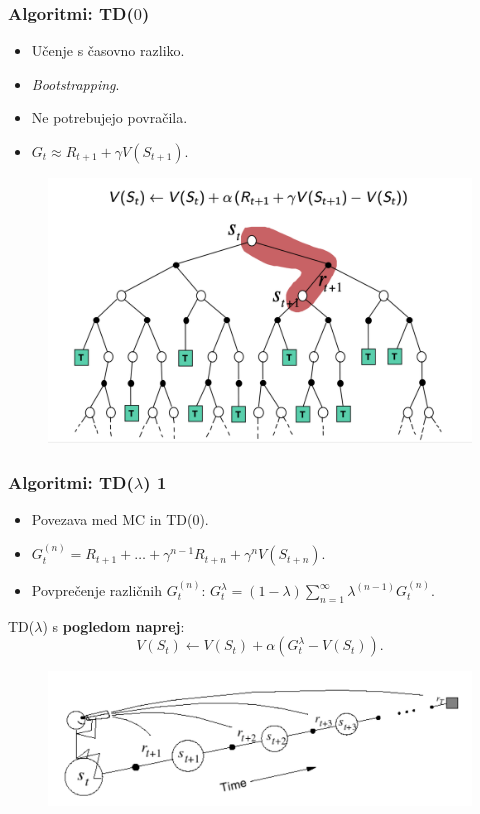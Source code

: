 \documentclass{beamer}    %
\begin{document}
\begin{frame}
    \frametitle{Algoritmi: TD($0$)}
    \begin{itemize}
        \item Učenje s časovno razliko.
        \item \textit{Bootstrapping}. 
        \item Ne potrebujejo povračila.
        \item $G_t \approx R_{t+1} + \gamma V(S_{t+1})$.
    \end{itemize}

    \begin{figure}[b]
        \includegraphics[scale=0.45]{slike/backup-td.png}
    \end{figure}
\end{frame}


\begin{frame}
    \frametitle{Algoritmi: TD($\lambda$) 1}
    \begin{itemize}
        \item Povezava med MC in TD($0$).
        \item $G_t^{(n)} = R_{t+1} + \dots + \gamma^{n-1} R_{t+n} + \gamma^n V(S_{t+n}).$
        \item Povprečenje različnih $G_t^{(n)}$: $G_t^\lambda = (1 - \lambda) \sum_{n=1}^\infty 
                                                 \lambda^{(n-1)} G_t^{(n)}.$
    \end{itemize}

    \medskip
    \medskip
    \medskip
    \pause
    TD($\lambda$) s \textbf{pogledom naprej}: 
    $$
    V(S_t) \leftarrow V(S_t) + \alpha (G_t^\lambda - V(S_t)).
    $$
    \begin{figure}[b]
        \includegraphics[scale=0.45]{slike/pogled-naprej.png}
    \end{figure}
\end{frame}
\end{document}
